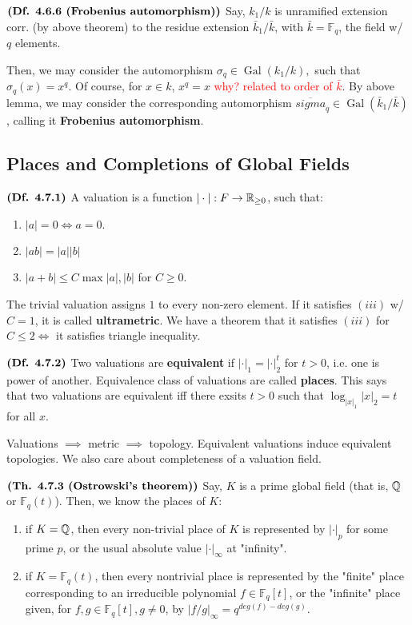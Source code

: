 \documentclass{article}
\DeclareMathOperator{\Gal}{Gal}
\begin{document}
$\textbf{(Df. 4.6.6 (Frobenius automorphism))}$ 
Say, $k_1/k$ is unramified extension corr. (by above theorem) to the residue extension $\bar{k}_1/\bar{k}$, with $\bar{k}=\mathbb{F}_q$, the field w/ $q$ elements.

Then, we may consider the automorphism $\sigma_q \in \Gal(k_1/k), $ such that $\sigma_q(x) = x^q$. Of course, for $x \in k$, $x^q = x$ \textcolor{red}{why? related to order of $\bar{k}$}. By above lemma, we may consider the corresponding automorphism $\overline{sigma}_q \in \Gal(\bar{k}_1/\bar{k})$, calling it \textbf{Frobenius automorphism}.

\subsection{Places and Completions of Global Fields}

$\textbf{(Df. 4.7.1)}$ A valuation is a function $|\cdot|:F \rightarrow \mathbb{R}_{\geq 0}$, such that:
\begin{enumerate}
    \item $|a| = 0 \iff a =0$.
    \item $|ab| = |a||b|$
    \item $|a+b| \leq C\max{|a|,|b|}$ for $C \geq 0$. 
\end{enumerate}

The trivial valuation assigns $1$ to every non-zero element. If it satisfies $(iii)$ w/ $C=1$, it is called \textbf{ultrametric}. We have a theorem that it satisfies $(iii)$ for $C \leq 2 \iff$ it satisfies triangle inequality.

$\textbf{(Df. 4.7.2)}$ Two valuations are \textbf{equivalent} if $|\cdot|_1 = |\cdot|_{2}^t$ for $t > 0$, i.e. one is power of another. Equivalence class of valuations are called \textbf{places}. This says that two valuations are equivalent iff there exsits $t > 0$ such that $\log_{|x|_1}|x|_2=t$ for all $x$.

Valuations $\implies$ metric $\implies$ topology. Equivalent valuations induce equivalent topologies. We also care about completeness of a valuation field.

$\textbf{(Th. 4.7.3 (Ostrowski's theorem))}$ Say, $K$ is a prime global field (that is, $\mathbb{Q}$ or $\mathbb{F}_q(t)$). Then, we know the places of $K$:

\begin{enumerate}
    \item if $K=\mathbb{Q}$, then every non-trivial place of $K$ is represented by $|\cdot|_p$ for some prime $p$, or the usual absolute value $|\cdot|_{\infty}$ at "infinity".
    \item if $K=\mathbb{F}_q(t)$, then every nontrivial place is represented by the "finite" place corresponding to an irreducible polynomial $f \in \mathbb{F}_q[t]$, or the "infinite" place given, for $f,g \in \mathbb{F}_q[t], g \ne 0$, by $|f/g|_{\infty} = q^{deg(f) - deg(g)}$.
\end{enumerate}
\end{document}
